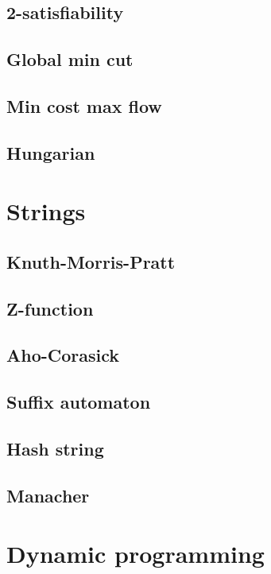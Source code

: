 \documentclass[10pt]{article}
\begin{document}
\subsection{2-satisfiability}

\subsection{Global min cut}

\subsection{Min cost max flow}

\subsection{Hungarian}


\section{Strings}
\subsection{Knuth-Morris-Pratt}

\subsection{Z-function}

\subsection{Aho-Corasick}

\subsection{Suffix automaton}

\subsection{Hash string}

\subsection{Manacher}


\section{Dynamic programming}
\end{document}
